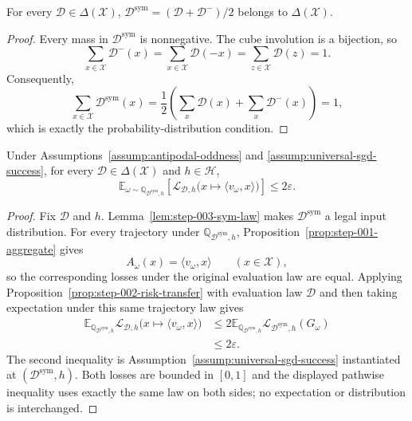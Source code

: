 \begin{lemma}
\label{lem:step-003-sym-law}
For every $\mathcal D\in\Delta(\mathcal X)$,
$\mathcal D^{\mathrm{sym}}=(\mathcal D+\mathcal D^-)/2$ belongs to
$\Delta(\mathcal X)$.
\end{lemma}

\begin{proof}
Every mass in $\mathcal D^{\mathrm{sym}}$ is nonnegative.  The cube
involution is a bijection, so
\[
\sum_{x\in\mathcal X}\mathcal D^-(x)
=\sum_{x\in\mathcal X}\mathcal D(-x)
=\sum_{z\in\mathcal X}\mathcal D(z)=1.
\]
Consequently,
\[
\sum_{x\in\mathcal X}\mathcal D^{\mathrm{sym}}(x)
=\frac12\left(\sum_x\mathcal D(x)+\sum_x\mathcal D^-(x)\right)=1,
\]
which is exactly the probability-distribution condition.
\end{proof}

\begin{proposition}
\label{prop:step-003-expected-transfer}
Under Assumptions~\ref{assump:antipodal-oddness} and
\ref{assump:universal-sgd-success}, for every
$\mathcal D\in\Delta(\mathcal X)$ and $h\in\mathcal H$,
\[
\mathbb E_{\omega\sim\mathbb Q_{\mathcal D^{\mathrm{sym}},h}}
 \left[\mathcal L_{\mathcal D,h}
 \bigl(x\mapsto\langle v_\omega,x\rangle\bigr)\right]
\leq2\varepsilon.
\]
\end{proposition}

\begin{proof}
Fix $\mathcal D$ and $h$.  Lemma~\ref{lem:step-003-sym-law} makes
$\mathcal D^{\mathrm{sym}}$ a legal input distribution.  For every trajectory
under $\mathbb Q_{\mathcal D^{\mathrm{sym}},h}$,
Proposition~\ref{prop:step-001-aggregate} gives
\[
A_\omega(x)=\langle v_\omega,x\rangle\qquad(x\in\mathcal X),
\]
so the corresponding losses under the original evaluation law are equal.
Applying Proposition~\ref{prop:step-002-risk-transfer} with evaluation law
$\mathcal D$ and then taking expectation under this same trajectory law gives
\[
\begin{aligned}
\mathbb E_{\mathbb Q_{\mathcal D^{\mathrm{sym}},h}}
 \mathcal L_{\mathcal D,h}\bigl(x\mapsto\langle v_\omega,x\rangle\bigr)
&\leq 2\mathbb E_{\mathbb Q_{\mathcal D^{\mathrm{sym}},h}}
 \mathcal L_{\mathcal D^{\mathrm{sym}},h}(G_\omega)\\
&\leq2\varepsilon.
\end{aligned}
\]
The second inequality is Assumption~\ref{assump:universal-sgd-success}
instantiated at $(\mathcal D^{\mathrm{sym}},h)$.  Both losses are bounded in
$[0,1]$ and the displayed pathwise inequality uses exactly the same law on
both sides; no expectation or distribution is interchanged.
\end{proof}


